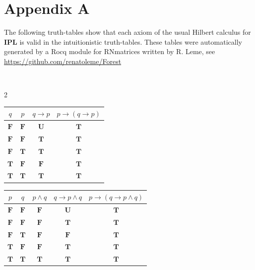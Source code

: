 \documentclass[12pt]{article}
\begin{document}
\newpage

\section*{Appendix A}

The following truth-tables show that each axiom of the usual Hilbert calculus for \textbf{IPL} is valid in the intuitionistic truth-tables. These tables were automatically generated by a Rocq module for RNmatrices written by R. Leme, see\\

\url{https://github.com/renatoleme/Forest}

\

{
\scriptsize

\begin{multicols}{2}
    \setbox\ltmcbox\vbox\bgroup
    \makeatletter\col@number\@ne
\begin{longtable}[]{@{}cccc@{}}
\toprule
\(q\) & \(p\) & \(q \to p\) & \(p \to (q \to p)\)\tabularnewline
\midrule
\endhead
\(\textbf{F}\) & \(\textbf{F}\) & \(\textbf{U}\) &
\(\textbf{T}\)\tabularnewline
\(\textbf{F}\) & \(\textbf{F}\) & \(\textbf{T}\) &
\(\textbf{T}\)\tabularnewline
\(\textbf{F}\) & \(\textbf{T}\) & \(\textbf{T}\) &
\(\textbf{T}\)\tabularnewline
\(\textbf{T}\) & \(\textbf{F}\) & \(\textbf{F}\) &
\(\textbf{T}\)\tabularnewline
\(\textbf{T}\) & \(\textbf{T}\) & \(\textbf{T}\) &
\(\textbf{T}\)\tabularnewline
\bottomrule
\end{longtable}
\unskip
\unpenalty
\unpenalty\egroup
\unvbox\ltmcbox

\setbox\ltmcbox\vbox\bgroup
\makeatletter\col@number\@ne
\begin{longtable}[]{@{}ccccc@{}}
    \toprule
    \(p\) & \(q\) & \(p \land q\) & \(q \to p \land q\) &
    \(p \to (q \to p \land q)\)\tabularnewline
    \midrule
    \endhead
    \(\textbf{F}\) & \(\textbf{F}\) & \(\textbf{F}\) & \(\textbf{U}\) &
    \(\textbf{T}\)\tabularnewline
    \(\textbf{F}\) & \(\textbf{F}\) & \(\textbf{F}\) & \(\textbf{T}\) &
    \(\textbf{T}\)\tabularnewline
    \(\textbf{F}\) & \(\textbf{T}\) & \(\textbf{F}\) & \(\textbf{F}\) &
    \(\textbf{T}\)\tabularnewline
    \(\textbf{T}\) & \(\textbf{F}\) & \(\textbf{F}\) & \(\textbf{T}\) &
    \(\textbf{T}\)\tabularnewline
    \(\textbf{T}\) & \(\textbf{T}\) & \(\textbf{T}\) & \(\textbf{T}\) &
    \(\textbf{T}\)\tabularnewline
    \bottomrule
    \end{longtable}
    \unskip
    \unpenalty
    \unpenalty\egroup
    \unvbox\ltmcbox
\end{multicols}


}
\end{document}
